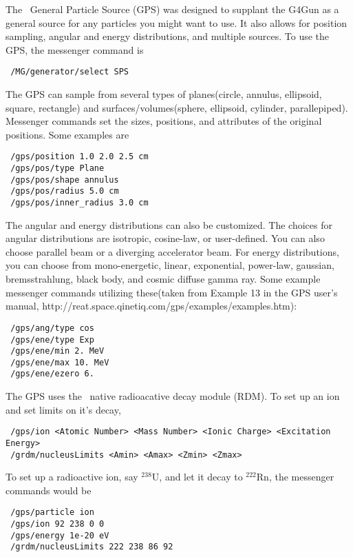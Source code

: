 The \geant \ General Particle Source (GPS) was designed to supplant the G4Gun as a
general source for any particles you might want to use.  It also allows for
position sampling, angular and energy distributions, and multiple sources.  To use the GPS, the messenger command is
%
\begin{lstlisting}
 /MG/generator/select SPS
\end{lstlisting}
The GPS can sample from several types of planes(circle, annulus, ellipsoid,
square, rectangle) and surfaces/volumes(sphere, ellipsoid, cylinder,
parallepiped).   Messenger commands set the sizes, positions, and attributes of
the original positions.  Some examples are
%
\begin{lstlisting}
 /gps/position 1.0 2.0 2.5 cm
 /gps/pos/type Plane
 /gps/pos/shape annulus
 /gps/pos/radius 5.0 cm
 /gps/pos/inner_radius 3.0 cm
\end{lstlisting}
%
The angular and energy distributions can also be customized.  The choices for
angular distributions are isotropic,
cosine-law, or user-defined.  You can also choose parallel beam or a diverging
accelerator beam.  For energy distributions, you can choose from mono-energetic,
linear, exponential, power-law, gaussian, bremsstrahlung, black body, and cosmic
diffuse gamma ray.  Some example messenger commands utilizing these(taken from
Example 13 in the GPS user's manual,
\hbox{http://reat.space.qinetiq.com/gps/examples/examples.htm}):
%
\begin{lstlisting}
 /gps/ang/type cos
 /gps/ene/type Exp
 /gps/ene/min 2. MeV
 /gps/ene/max 10. MeV
 /gps/ene/ezero 6.
\end{lstlisting}
%
The GPS uses the \geant \ native radioacative decay module (RDM).  To set up an
ion and set limits on it's decay, 
\begin{lstlisting}
 /gps/ion <Atomic Number> <Mass Number> <Ionic Charge> <Excitation Energy>
 /grdm/nucleusLimits <Amin> <Amax> <Zmin> <Zmax>
\end{lstlisting}

To set up
a radioactive ion, say $^{238}$U, and let it decay to $^{222}$Rn, the messenger
commands would be
%
\begin{lstlisting}
 /gps/particle ion
 /gps/ion 92 238 0 0
 /gps/energy 1e-20 eV
 /grdm/nucleusLimits 222 238 86 92 
\end{lstlisting}
%
\noindent

